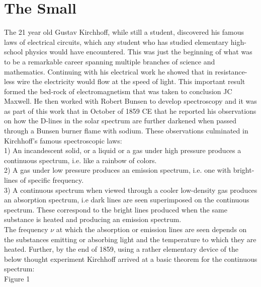 \documentclass[11pt]{article} %
\numberwithin{equation}{section}
\begin{document}
\section{The Small}
The 21 year old Gustav Kirchhoff, while still a student, discovered his famous laws of electrical circuits, which any student who has studied elementary high-school physics would have encountered. This was just the beginning of what was to be a remarkable career spanning multiple branches of science and mathematics. Continuing with his electrical work he showed that in resistance-less wire the electricity would flow at the speed of light. This important result formed the bed-rock of electromagnetism that was taken to conclusion JC Maxwell. He then worked with Robert Bunsen to develop spectroscopy and it was as part of this work that in October of 1859 CE that he reported  his observations on how the D-lines in the solar spectrum are further darkened when passed through a Bunsen burner flame with sodium. These observations culminated in Kirchhoff’s famous spectroscopic laws:\\
1) An incandescent solid, or a liquid or a gas under high pressure produces a continuous spectrum, i.e. like a rainbow of colors.\\
2) A gas under low pressure produces an emission spectrum, i.e. one with bright-lines of specific frequency.\\
3) A continuous spectrum when viewed through a cooler low-density gas produces an absorption spectrum, i.e dark lines are seen superimposed on the continuous spectrum.  These correspond to the bright lines produced when the same substance is heated and producing an emission spectrum.\\

The frequency $\nu$ at which the absorption or emission lines are seen depends on the substances emitting or absorbing light and the temperature to which they are heated. Further, by the end of 1859, using a rather elementary device of the below thought experiment Kirchhoff arrived at a basic theorem for the continuous spectrum:\\

Figure 1\\
\end{document}
